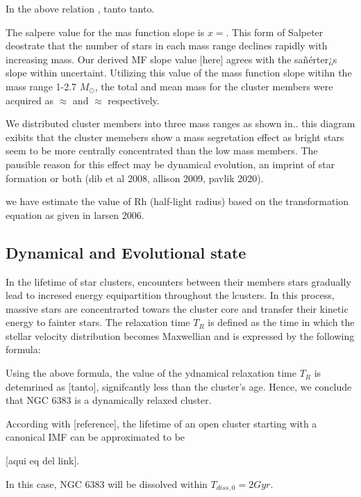 \documentclass[fleqn,usenatbib,usedcolumn,useAMS]{mnras}
\begin{document}
In the above relation , tanto tanto.

The salpere value for the mas function slope is $x =$. This form of Salpeter deostrate that the number of stars in each mass range declines rapidly with increasing mass. Our derived MF slope value [here] agrees with the sañérter¿s slope within uncertaint. Utilizing this value of the mass function slope witihn the mass range 1-2.7 $M_\odot$, the total and mean mass for the cluster members were acquired as $\approx$ and $\approx$ respectively.

We distributed cluster members into three mass ranges as shown in.. this diagram exibits that the cluster memebers show a mass segretation effect as bright stars seem to be more centrally concentrated than the low mass members. The pausible reason for this effect may be dynamical evolution, an imprint of star formation or both (dib et al 2008, allison 2009, pavlik 2020). 

we have estimate the value of Rh (half-light radius) based on the transformation equation as given in larsen 2006.


\subsection{Dynamical and Evolutional state}

In the lifetime of star clusters, encounters between their members stars gradually lead to incresed energy equipartition throughout the lcusters. In this process, massive stars are concentrarted towars the cluster core and transfer their kinetic energy to fainter stars. The relaxation time $T_R$ is defined as the time in which the stellar velocity distribution becomes Maxwellian and is expressed by the following formula:


Using the above formula, the value of the ydnamical relaxation time $T_R$ is detemrined as [tanto], signifcantly less than the cluster's age. Hence, we conclude that NGC 6383 is a dynamically relaxed cluster.

According with [reference], the lifetime of an open cluster starting with a canonical IMF can be approximated to be 

[aqui eq del link].

In this case, NGC 6383 will be dissolved within $T_{diss,0} = 2 Gyr$.
\end{document}
